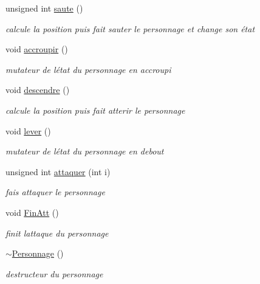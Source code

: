 \begin{DoxyCompactItemize}
unsigned int \hyperlink{class_personnage_ad4433e84bb7db52eef9730a8d82bf2e7}{saute} ()
\begin{DoxyCompactList}\small\item\em calcule la position puis fait sauter le personnage et change son état \end{DoxyCompactList}\item 
\mbox{\label{class_personnage_ad883de70d637eacef79d0c1df3d5ce56}} 
void \hyperlink{class_personnage_ad883de70d637eacef79d0c1df3d5ce56}{accroupir} ()
\begin{DoxyCompactList}\small\item\em mutateur de l\textquotesingle{}état du personnage en accroupi \end{DoxyCompactList}\item 
\mbox{\label{class_personnage_a35a8f12ff9d675768cd3ba986a63f7f0}} 
void \hyperlink{class_personnage_a35a8f12ff9d675768cd3ba986a63f7f0}{descendre} ()
\begin{DoxyCompactList}\small\item\em calcule la position puis fait atterir le personnage \end{DoxyCompactList}\item 
\mbox{\label{class_personnage_aa7effa244609c3b67e29913422dc73f7}} 
void \hyperlink{class_personnage_aa7effa244609c3b67e29913422dc73f7}{lever} ()
\begin{DoxyCompactList}\small\item\em mutateur de l\textquotesingle{}état du personnage en debout \end{DoxyCompactList}\item 
unsigned int \hyperlink{class_personnage_a6ad36c6261ce6f48966d58cf36d193e2}{attaquer} (int i)
\begin{DoxyCompactList}\small\item\em fais attaquer le personnage \end{DoxyCompactList}\item 
\mbox{\label{class_personnage_a667748af7167778eabc5784fb4edc378}} 
void \hyperlink{class_personnage_a667748af7167778eabc5784fb4edc378}{Fin\+Att} ()
\begin{DoxyCompactList}\small\item\em finit l\textquotesingle{}attaque du personnage \end{DoxyCompactList}\item 
\mbox{\label{class_personnage_a05bdf2a469885bb1fbb6c2e8f98972ab}} 
\hyperlink{class_personnage_a05bdf2a469885bb1fbb6c2e8f98972ab}{$\sim$\+Personnage} ()
\begin{DoxyCompactList}\small\item\em destructeur du personnage \end{DoxyCompactList}\end{DoxyCompactItemize}


